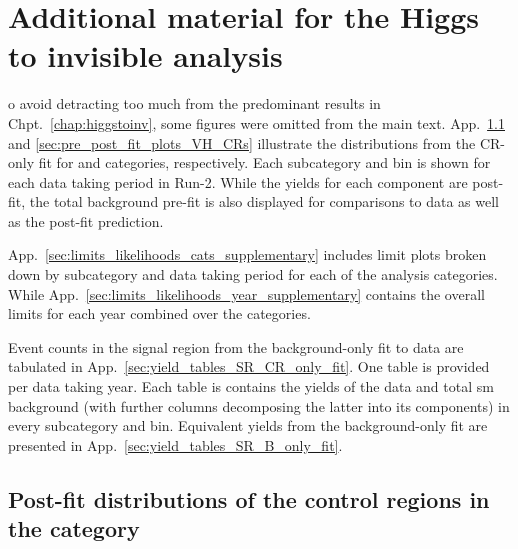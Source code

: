 \chapter{Additional material for the Higgs to invisible analysis}
\label{app:supplementary_hinv_plots}

o avoid detracting too much from the predominant results in Chpt.~\ref{chap:higgstoinv}, some figures were omitted from the main text. App.~\ref{sec:pre_post_fit_plots_ttH_CRs} and \ref{sec:pre_post_fit_plots_VH_CRs} illustrate the distributions from the \gls{CR}-only fit for \ttH and \VH categories, respectively. Each subcategory and \ptmiss bin is shown for each data taking period in Run-2. While the yields for each component are post-fit, the total background pre-fit is also displayed for comparisons to data as well as the post-fit prediction.

App.~\ref{sec:limits_likelihoods_cats_supplementary} includes limit plots broken down by subcategory and data taking period for each of the analysis categories. While App.~\ref{sec:limits_likelihoods_year_supplementary} contains the overall limits for each year combined over the categories.

Event counts in the signal region from the background-only fit to data are tabulated in App.~\ref{sec:yield_tables_SR_CR_only_fit}. One table is provided per data taking year. Each table is contains the yields of the data and total \acrshort{sm} background (with further columns decomposing the latter into its components) in every subcategory and \ptmiss bin. Equivalent yields from the background-only fit are presented in App.~\ref{sec:yield_tables_SR_B_only_fit}.




\section{Post-fit distributions of the control regions in the \texorpdfstring{\ttH}{ttH} category}
\label{sec:pre_post_fit_plots_ttH_CRs}

